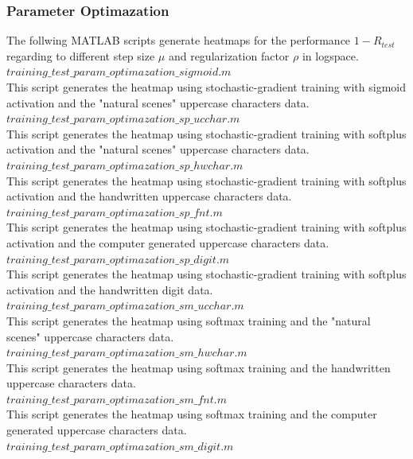 \documentclass[journal,a4paper,onecolumn,11pt]{IEEEtran}
\begin{document}
\subsubsection{Parameter Optimazation}
The follwing MATLAB scripts generate heatmaps for the performance $1-R_{test}$ regarding to different step size $\mu$ and regularization factor $\rho$ in logspace.\\
$training\_test\_param\_optimazation\_sigmoid.m$\\
This script generates the heatmap using stochastic-gradient training with sigmoid activation and the "natural scenes" uppercase characters data.\\
$training\_test\_param\_optimazation\_sp\_ucchar.m$\\
This script generates the heatmap using stochastic-gradient training with softplus activation and the "natural scenes" uppercase characters data.\\
$training\_test\_param\_optimazation\_sp\_hwchar.m$\\
This script generates the heatmap using stochastic-gradient training with softplus activation and the handwritten uppercase characters data.\\
$training\_test\_param\_optimazation\_sp\_fnt.m$\\
This script generates the heatmap using stochastic-gradient training with softplus activation and the computer generated uppercase characters data.\\
$training\_test\_param\_optimazation\_sp\_digit.m$\\
This script generates the heatmap using stochastic-gradient training with softplus activation and the handwritten digit data.\\
$training\_test\_param\_optimazation\_sm\_ucchar.m$\\
This script generates the heatmap using softmax training and the "natural scenes" uppercase characters data.\\
$training\_test\_param\_optimazation\_sm\_hwchar.m$\\
This script generates the heatmap using softmax training and the handwritten uppercase characters data.\\
$training\_test\_param\_optimazation\_sm\_fnt.m$\\
This script generates the heatmap using softmax training and the computer generated uppercase characters data.\\
$training\_test\_param\_optimazation\_sm\_digit.m$\\
\end{document}
